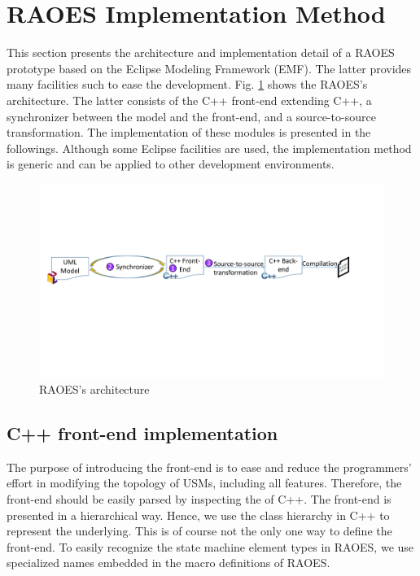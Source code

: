 \section{RAOES Implementation Method}
\label{sec:implementation}
This section presents the architecture and implementation detail of a RAOES prototype based on the Eclipse Modeling Framework (EMF).
The latter provides many facilities such to ease the development.
Fig. \ref{fig:architecture} shows the RAOES's architecture.
The latter consists of the C++ front-end extending C++, a synchronizer between the model and the front-end, and a source-to-source transformation.
The implementation of these modules is presented in the followings. 
Although some Eclipse facilities are used, the implementation method is generic and can be applied to other development environments.

\begin{figure}
	\centering
	\includegraphics[clip, trim=0.8cm 9.5cm 3.2cm 6.8cm, width=1.0\columnwidth]{figures/architecture.pdf}
	\caption{RAOES's architecture} 
	\label{fig:architecture}
\end{figure}

\subsection{C++ front-end implementation}
The purpose of introducing the front-end is to ease and reduce the programmers' effort in modifying the topology of USMs, including all features.
Therefore, the front-end should be easily parsed by inspecting the  of C++.
The front-end is presented in a hierarchical way.
Hence, we use the class hierarchy in C++ to represent the underlying.
This is of course not the only one way to define the front-end.
To easily recognize the state machine element types in RAOES, we use specialized names embedded in the macro definitions of RAOES. 

